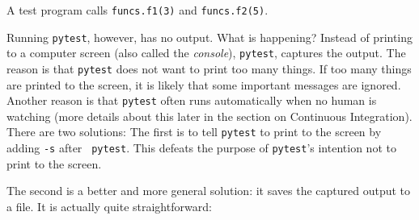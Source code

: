 A test program calls {\tt funcs.f1(3)} and {\tt funcs.f2(5)}.

\resetlinenumber[1]
\linenumbers
\begin{tt}
  
\end{tt}
\nolinenumbers

Running {\tt pytest}, however, has no output. What is happening?
Instead of printing to a computer screen (also called the {\it
  console}), {\tt pytest}, captures the output.  The reason is that
{\tt pytest} does not want to print too many things.  If too many
things are printed to the screen, it is likely that some important
messages are ignored. Another reason is that {\tt pytest} often runs
automatically when no human is watching (more details about this
later in the section on Continuous Integration).
There are two solutions: The first is to tell
{\tt pytest} to print to the screen by adding {\tt -s} after {\tt
  pytest}.  This defeats the purpose of {\tt pytest}'s intention not
to print to the screen.


The second is a better and more general solution: it saves the
captured output to a file. It is actually quite straightforward:

\resetlinenumber[1]
\linenumbers
\begin{tt}
  
\end{tt}
\nolinenumbers


